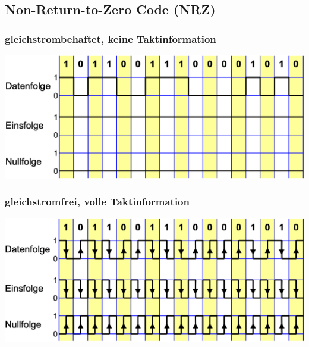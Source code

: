 \subsection{Non-Return-to-Zero Code (NRZ)}
\subsubsection{gleichstrombehaftet, keine Taktinformation}
\begin{center}
    \includegraphics[width=\linewidth]{graphic/signalparameter/gleichstrombehaftet.png}
\end{center}
\vspace{-8pt}

\subsubsection{gleichstromfrei, volle Taktinformation}
\begin{center}
    \includegraphics[width=\linewidth]{graphic/signalparameter/gleichstromfrei.png}
\end{center}
\vspace{-8pt}

